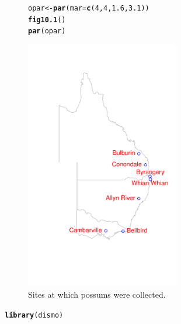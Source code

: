 \documentclass[12pt, a4paper,  BCOR=8.25mm, DIV=15]{scrartcl}\usepackage[]{graphicx}\usepackage[]{color}
\makeatletter
\newcommand{\hlnum}[1]{\textcolor[rgb]{0.686,0.059,0.569}{#1}}%
\newcommand{\hlstd}[1]{\textcolor[rgb]{0.345,0.345,0.345}{#1}}%
\newcommand{\hlkwb}[1]{\textcolor[rgb]{0.69,0.353,0.396}{#1}}%
\newcommand{\hlkwc}[1]{\textcolor[rgb]{0.333,0.667,0.333}{#1}}%
\newcommand{\hlkwd}[1]{\textcolor[rgb]{0.737,0.353,0.396}{\textbf{#1}}}%
\newenvironment{kframe}{%
 \def\at@end@of@kframe{}%
 \ifinner\ifhmode%
  \def\at@end@of@kframe{\end{minipage}}%
  \begin{minipage}{\columnwidth}%
 \fi\fi%
 \def\FrameCommand##1{\hskip\@totalleftmargin \hskip-\fboxsep
 \colorbox{shadecolor}{##1}\hskip-\fboxsep
     \hskip-\linewidth \hskip-\@totalleftmargin \hskip\columnwidth}%
 \MakeFramed {\advance\hsize-\width
   \@totalleftmargin\z@ \linewidth\hsize
   \@setminipage}}%
 {\par\unskip\endMakeFramed%
 \at@end@of@kframe}
\newenvironment{knitrout}{}{} %
\makeatother
\begin{document}
\begin{figure}
\begin{knitrout}
\color{fgcolor}\begin{kframe}
\begin{alltt}
\hlstd{opar} \hlkwb{<-} \hlkwd{par}\hlstd{(}\hlkwc{mar}\hlstd{=}\hlkwd{c}\hlstd{(}\hlnum{4}\hlstd{,}\hlnum{4}\hlstd{,}\hlnum{1.6}\hlstd{,}\hlnum{3.1}\hlstd{))}
\hlkwd{fig10.1}\hlstd{()}
\hlkwd{par}\hlstd{(opar)}
\end{alltt}
\end{kframe}

{\centering \includegraphics[width=0.6\textwidth]{figs/map-oz-sites-10_1-1} 

}



\end{knitrout}

\caption{Sites at which possums were collected.\label{fig:possumsites}}
\end{figure}

\begin{knitrout}
\color{fgcolor}\begin{kframe}
\begin{alltt}
\hlkwd{library}\hlstd{(dismo)}
\end{alltt}


{\ttfamily\noindent\itshape\color{messagecolor}{Loading required package: raster}}\end{kframe}
\end{knitrout}
\end{document}
